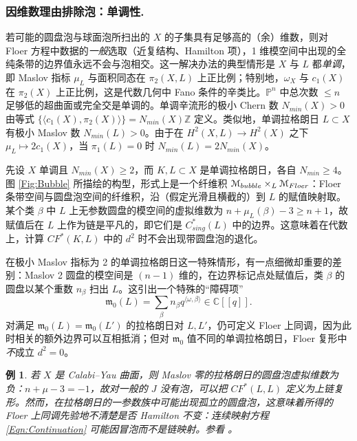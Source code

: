 \documentclass[11pt,a4paper]{article}
\numberwithin{equation}{section}
\newtheorem{Example}[thm]{例}
\newcommand{\bZ}{\mathbb{Z}}
\newcommand{\bC}{\mathbb{C}}
\newcommand{\bP}{\mathbb{P}}
\newcommand{\scrM}{\EuScript{M}}
\providecommand{\frak}[1]{\mathfrak{#1}}
\begin{document}
\subsubsection{因维数理由排除泡：单调性.\label{Sec:Monotone}} 若可能的圆盘泡与球面泡所扫出的 $X$ 的子集具有足够高的（余）维数，则对 Floer 方程中数据的\emph{一般}选取（近复结构、Hamilton 项），1 维模空间中出现的全纯条带的边界值永远不会与泡相交。这一解决办法的典型情形是 $X$ 与 $L$ 都\emph{单调}，即 Maslov 指标 $\mu_L$ 与面积同态在 $\pi_2(X,L)$ 上正比例；特别地，$\omega_X$ 与 $c_1(X)$ 在 $\pi_2(X)$ 上正比例，这是代数几何中 Fano 条件的辛类比。$\bP^n$ 中总次数 $\leq n$ 足够低的超曲面或完全交是单调的。单调辛流形的极小 Chern 数 $N_{min}(X)>0$ 由等式 $\{\langle c_1(X), \pi_2(X)\rangle\} = N_{min}(X)\bZ$ 定义。类似地，单调拉格朗日 $L\subset X$ 有极小 Maslov 数 $N_{min}(L)>0$。由于在 $H^2(X,L)\rightarrow H^2(X)$ 之下 $\mu_L \mapsto 2c_1(X)$，当 $\pi_1(L)=0$ 时 $N_{min}(L) = 2N_{min}(X)$。

先设 $X$ 单调且 $N_{min}(X) \geq 2$，而 $K, L\subset X$ 是单调拉格朗日，各自 $N_{min}\geq 4$。图 \ref{Fig:Bubble} 所描绘的构型，形式上是一个纤维积 $\scrM_{bubble} \times_L \scrM_{Floer}$：Floer 条带空间与圆盘泡空间的纤维积，沿（假定光滑且横截的）到 $L$ 的赋值映射取。某个类 $\beta$ 中 $L$ 上无参数圆盘的模空间的虚拟维数为 $n+\mu_L(\beta)-3 \geq n+1$，故赋值后在 $L$ 上作为链是平凡的，即它们是 $C^*_{sing}(L)$ 中的边界。这意味着在代数上，计算 $CF^*(K,L)$ 中的 $d^2$ 时不会出现带圆盘泡的退化。

在极小 Maslov 指标为 2 的单调拉格朗日这一特殊情形，有一点细微却重要的差别：Maslov 2 圆盘的模空间是 $(n-1)$ 维的，在边界标记点处赋值后，类 $\beta$ 的圆盘以某个重数 $n_{\beta}$ 扫出 $L$。这引出一个特殊的“障碍项”
\[
\frak{m}_0(L) = \sum_{\beta} n_{\beta} q^{\langle \omega, \beta\rangle} \in \bC[\![q]\!].
\] 对满足 $\frak{m}_0(L) = \frak{m}_0(L')$ 的拉格朗日对 $L, L'$，仍可定义 Floer 上同调，因为此时相关的额外边界可以互相抵消；但对 $\frak{m}_0$ 值不同的单调拉格朗日，Floer 复形中\emph{不}成立 $d^2=0$。

\begin{Example} \label{Ex:CY} 若 $X$ 是 Calabi–Yau 曲面，则 Maslov 零的拉格朗日的圆盘泡虚拟维数为负：$n+\mu-3 = -1$，故对一般的 $J$ 没有泡，可以把 $CF^*(L,L)$ 定义为上链复形。然而，在拉格朗日的一参数族中可能出现孤立的圆盘泡，这意味着所得的 Floer 上同调\emph{先验地}不清楚是否 Hamilton 不变：连续映射方程 \eqref{Eqn:Continuation} 可能因冒泡而不是链映射。参看 \cite[Section 8]{Seidel:HMSquartic}。
\end{Example}
\end{document}
